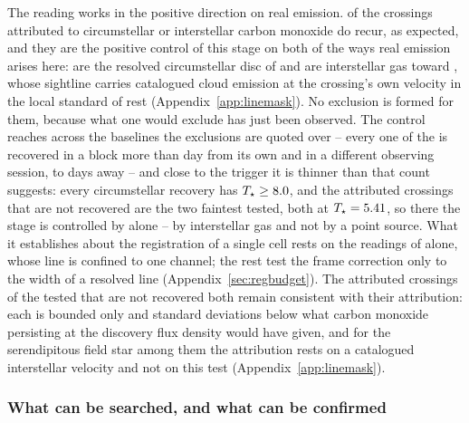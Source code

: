 The reading works in the positive direction on real emission.
\MkAttrRecur{} of the \MkAttrTested{} crossings attributed to circumstellar or
interstellar carbon monoxide do recur, as expected, and they are the positive
control of this stage on both of the ways real emission arises here:
\RqNRecurDisc{} are the resolved circumstellar disc of \RqRecurDiscStars{} and
\RqNRecurCloud{} are interstellar gas toward \RqRecurCloudStars, whose
sightline carries catalogued cloud emission at the crossing's own velocity in
the local standard of rest (Appendix~\ref{app:linemask}). No exclusion is
formed for them, because what one would exclude has just been observed. The
control reaches across the baselines the exclusions are quoted over -- every
one of the \QcNCtl{} is recovered in a block more than \EpSep{} day from its
own and in a different observing session, \QcSepMinD{} to \QcSepMaxD{} days
away -- and close to the trigger it is thinner than
that count suggests: every circumstellar recovery has
$T_\star\ge8.0$, and the \RqNearTrigN{} attributed crossings that
are not recovered are the two faintest tested, both at
$T_\star=5.41$, so there the stage is controlled by
\RqRecurCloudStars{} alone -- by interstellar gas and not by a point
source. What it establishes about the registration of a single cell rests on the
\RgRegNUnres{} readings of \RgRegStar{} alone, whose line is confined to one
channel; the rest test the frame correction only to the width of a resolved
line (Appendix~\ref{sec:regbudget}). The \MkAttrExcl{}
attributed crossings of the \MkAttrTested{} tested that are not recovered both
remain consistent with their attribution: each is bounded only \RqHrExcl{} and
\RqAjExcl{} standard deviations below what carbon monoxide persisting at the
discovery flux density would have given, and for the serendipitous field star
among them the attribution rests on a catalogued interstellar velocity and not
on this test (Appendix~\ref{app:linemask}).

\subsubsection{What can be searched, and what can be confirmed}
\label{sec:confirmability}

